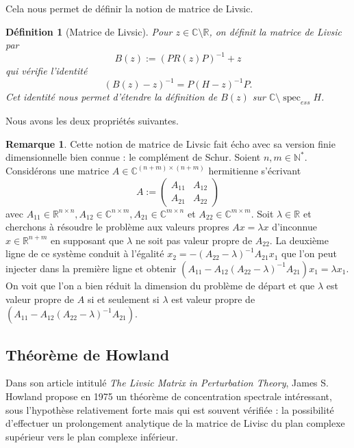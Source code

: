 \documentclass[12pt,openany,a4paper, titlepage]{article}
\newcommand{\R}{\mathbb{R}}
\newcommand{\C}{\mathbb{C}}
\newcommand{\N}{\mathbb{N}}
\newcommand{\spec}{\operatorname{spec}}
\newcommand{\inv}{^{-1}}
\newtheorem{Def}{Définition}
\theoremstyle{definition}
\theoremstyle{definition}
\theoremstyle{definition}
\theoremstyle{definition}
\theoremstyle{definition}
\newtheorem{rem}{Remarque}
\theoremstyle{definition}
\begin{document}
Cela nous permet de définir la notion de matrice de Livsic.

\begin{Def}[Matrice de Livsic]
Pour $z\in \C\setminus\R$, on définit la matrice de Livsic par
\begin{equation*}
    B(z) := (PR(z)P)\inv + z
\end{equation*}
qui vérifie l'identité 
\begin{equation*}
    (B(z)-z)\inv = P(H-z)\inv P.
\end{equation*}
Cet identité nous permet d'étendre la définition de $B(z)$ sur $\C\setminus\spec_{ess} H$.
\end{Def}

Nous avons les deux propriétés suivantes.

\begin{rem}
Cette notion de matrice de Livsic fait écho avec sa version finie dimensionnelle bien connue : le complément de Schur.  
Soient $n,m \in\N^*$. Considérons une matrice $A\in\C^{(n+m)\times (n+m)}$ hermitienne s'écrivant 
\begin{equation*}
    A:= \begin{pmatrix}
A_{11} & A_{12} \\
A_{21} & A_{22} 
\end{pmatrix}
\end{equation*}
avec $A_{11}\in\R^{n\times n},  A_{12}\in\C^{n\times m}, A_{21}\in\C^{m\times n}$ et $A_{22}\in\C^{m\times m}$. Soit $\lambda \in \R$ et cherchons à résoudre le problème aux valeurs propres $Ax = \lambda x$ d'inconnue $x\in\R^{n+m}$ en supposant que $\lambda$ ne soit pas valeur propre de $A_{22}$. La deuxième ligne de ce système conduit à l'égalité $x_2 = -(A_{22}-\lambda)^{-1}A_{21}x_1$ que l'on peut injecter dans la première ligne et obtenir $(A_{11} - A_{12}(A_{22}-\lambda)^{-1}A_{21})x_1 = \lambda x_1 $. On voit que l'on a bien réduit la dimension du problème de départ et que $\lambda$ est valeur propre de $A$ si et seulement si $\lambda$ est valeur propre de $(A_{11} - A_{12}(A_{22}-\lambda)^{-1}A_{21})$.
\end{rem}

\subsection{Théorème de Howland}

Dans son article intitulé \textit{The Livsic  Matrix in Perturbation Theory}, James S. Howland propose en 1975 un théorème de concentration spectrale intéressant, sous l'hypothèse relativement forte mais qui est souvent vérifiée : la possibilité d'effectuer un prolongement analytique de la matrice de Livisc du plan complexe supérieur vers le plan complexe inférieur.
\end{document}
